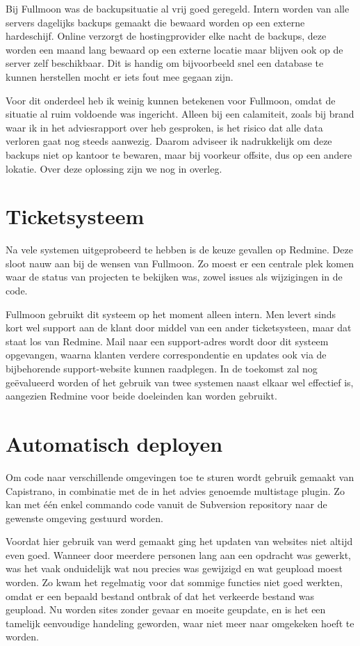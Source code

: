 Bij Fullmoon was de backupsituatie al vrij goed geregeld. Intern worden van alle servers dagelijks backups gemaakt die bewaard worden op een externe hardeschijf. Online verzorgt de hostingprovider elke nacht de backups, deze worden een maand lang bewaard op een externe locatie maar blijven ook op de server zelf beschikbaar. Dit is handig om bijvoorbeeld snel een database te kunnen herstellen mocht er iets fout mee gegaan zijn.

Voor dit onderdeel heb ik weinig kunnen betekenen voor Fullmoon, omdat de situatie al ruim voldoende was ingericht. Alleen bij een calamiteit, zoals bij brand waar ik in het adviesrapport over heb gesproken, is het risico dat alle data verloren gaat nog steeds aanwezig. Daarom adviseer ik nadrukkelijk om deze backups niet op kantoor te bewaren, maar bij voorkeur offsite, dus op een andere lokatie. Over deze oplossing zijn we nog in overleg.

\section{Ticketsysteem}

Na vele systemen uitgeprobeerd te hebben is de keuze gevallen op Redmine. Deze sloot nauw aan bij de wensen van Fullmoon. Zo moest er een centrale plek komen waar de status van projecten te bekijken was, zowel issues als wijzigingen in de code.

Fullmoon gebruikt dit systeem op het moment alleen intern. Men levert sinds kort wel support aan de klant door middel van een ander ticketsysteen, maar dat staat los van Redmine. Mail naar een support-adres wordt door dit systeem opgevangen, waarna klanten verdere correspondentie en updates ook via de bijbehorende support-website kunnen raadplegen. In de toekomst zal nog geëvalueerd worden of het gebruik van twee systemen naast elkaar wel effectief is, aangezien Redmine voor beide doeleinden kan worden gebruikt.

\section{Automatisch deployen}

Om code naar verschillende omgevingen toe te sturen wordt gebruik gemaakt van Capistrano, in combinatie met de in het advies genoemde multistage plugin. Zo kan met één enkel commando code vanuit de Subversion repository naar de gewenste omgeving gestuurd worden.

Voordat hier gebruik van werd gemaakt ging het updaten van websites niet altijd even goed. Wanneer door meerdere personen lang aan een opdracht was gewerkt, was het vaak onduidelijk wat nou precies was gewijzigd en wat geupload moest worden. Zo kwam het regelmatig voor dat sommige functies niet goed werkten, omdat er een bepaald bestand ontbrak of dat het verkeerde bestand was geupload. Nu worden sites zonder gevaar en moeite geupdate, en is het een tamelijk eenvoudige handeling geworden, waar niet meer naar omgekeken hoeft te worden.

